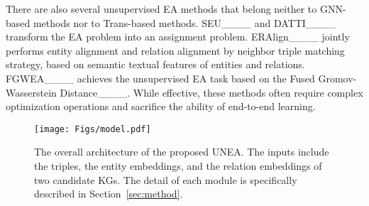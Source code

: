 There are also several unsupervised EA methods that belong neither to GNN-based methods nor to Trans-based methods. SEU____ and DATTI____ transform the EA problem into an assignment problem. ERAlign____ jointly performs entity alignment and relation alignment by neighbor triple matching strategy, based on semantic textual features of entities and relations. FGWEA____ achieves the unsupervised EA task based on the Fused Gromov-Wasserstein Distance____. While effective, these methods often require complex optimization operations and sacrifice the ability of end-to-end learning.



\begin{figure*}[ht]
\centering
\texttt{[image: Figs/model.pdf]}
\caption{The overall architecture of the proposed UNEA. The inputs include the triples, the entity embeddings, and the relation embeddings of two candidate KGs. The detail of each module is specifically described in Section~\ref{sec:method}.}
\label{fig:overview}
\end{figure*}